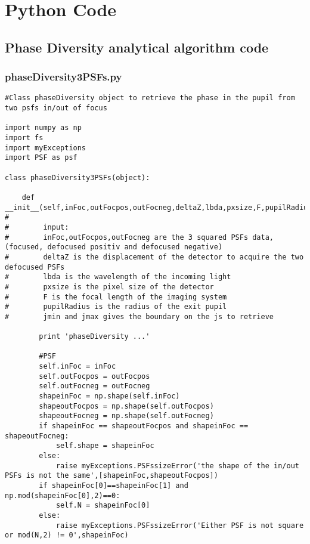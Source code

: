 

\chapter{Python Code}
\label{AppPythonCode}

\section{Phase Diversity analytical algorithm code}
\label{app:phaseDiversityanAlgoCode}

\subsection{phaseDiversity3PSFs.py}
\label{subapp:phaseDiversity3PSFs}

\begin{lstlisting}
#Class phaseDiversity object to retrieve the phase in the pupil from two psfs in/out of focus

import numpy as np
import fs
import myExceptions
import PSF as psf

class phaseDiversity3PSFs(object):

    def __init__(self,inFoc,outFocpos,outFocneg,deltaZ,lbda,pxsize,F,pupilRadius,jmin,jmax):
#        
#        input:
#        inFoc,outFocpos,outFocneg are the 3 squared PSFs data, (focused, defocused positiv and defocused negative)
#        deltaZ is the displacement of the detector to acquire the two defocused PSFs
#        lbda is the wavelength of the incoming light
#        pxsize is the pixel size of the detector
#        F is the focal length of the imaging system
#        pupilRadius is the radius of the exit pupil
#        jmin and jmax gives the boundary on the js to retrieve
        
        print 'phaseDiversity ...'        
        
        #PSF
        self.inFoc = inFoc
        self.outFocpos = outFocpos
        self.outFocneg = outFocneg
        shapeinFoc = np.shape(self.inFoc)
        shapeoutFocpos = np.shape(self.outFocpos)
        shapeoutFocneg = np.shape(self.outFocneg)
        if shapeinFoc == shapeoutFocpos and shapeinFoc == shapeoutFocneg:
            self.shape = shapeinFoc
        else:
            raise myExceptions.PSFssizeError('the shape of the in/out PSFs is not the same',[shapeinFoc,shapeoutFocpos])
        if shapeinFoc[0]==shapeinFoc[1] and np.mod(shapeinFoc[0],2)==0:
            self.N = shapeinFoc[0]
        else:
            raise myExceptions.PSFssizeError('Either PSF is not square or mod(N,2) != 0',shapeinFoc)
            

\end{lstlisting}
